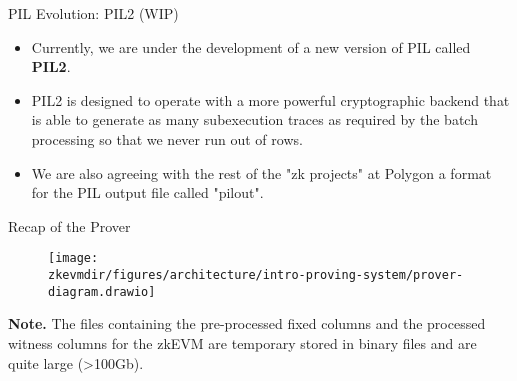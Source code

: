 \begin{frame}{PIL Evolution: PIL2 (WIP)}
\begin{itemize}
\item Currently, we are under the development of a new version of PIL called \textbf{PIL2}.

\vspace{0.2cm}
\item PIL2 is designed to operate with a more powerful cryptographic backend that is able to 
generate as many subexecution traces as required by the batch processing so that we never run out of rows.

\vspace{0.2cm}
\item We are also agreeing with the rest of the "zk projects" at Polygon a format for the PIL output file called "pilout".
\end{itemize}
\end{frame}





\begin{frame} {Recap of the Prover}
\begin{figure}
\centering
\texttt{[image: \\zkevmdir/figures/architecture/intro-proving-system/prover-diagram.drawio]}
\end{figure}

\footnotesize
\textbf{Note.} The files containing the pre-processed fixed columns and the processed witness columns for the zkEVM are temporary stored in binary files and are quite large (>100Gb).
\end{frame}



